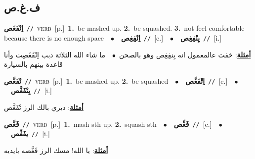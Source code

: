 \documentclass[10pt,a4paper,twoside]{article} %
\begin{document}
\begin{multicols}{2}
\vspace{-3mm}
\subsection*{\color{blue}\foreignlanguage{arabic}{ف.غ.ص}\color{blue}{}} 

{\setlength\topsep{0pt}\textbf{\foreignlanguage{arabic}{اِنْفَغَص}}\ {\color{gray}\texttt{//}\color{black}}\ \textsc{verb}\ [p.]\ \textbf{1.}~be mashed up.  \textbf{2.}~be squashed.  \textbf{3.}~not feel comfortable because there is no enough space\ \ $\bullet$\ \ \setlength\topsep{0pt}\textbf{\foreignlanguage{arabic}{اِنْفِغِص}}\ {\color{gray}\texttt{//}\color{black}}\ [c.]\ \ $\bullet$\ \ \setlength\topsep{0pt}\textbf{\foreignlanguage{arabic}{يِنْفِغِص}}\ {\color{gray}\texttt{//}\color{black}}\ [i.]\  \begin{flushright}\color{gray}\foreignlanguage{arabic}{\textbf{\underline{\foreignlanguage{arabic}{أمثلة}}}: خفت عالمعمول انه يِنفِغِص وهو بالصحن\ $\bullet$\ \  ما شاء الله الثلاثة دبب اِنْفَغَصِت وأنا قاعدة بينهم بالسيارة}\end{flushright}\color{black}} \vspace{2mm}

{\setlength\topsep{0pt}\textbf{\foreignlanguage{arabic}{تْفَغَّص}}\ {\color{gray}\texttt{//}\color{black}}\ \textsc{verb}\ [p.]\ \textbf{1.}~be mashed up.  \textbf{2.}~be squashed\ \ $\bullet$\ \ \setlength\topsep{0pt}\textbf{\foreignlanguage{arabic}{اِتْفَغَّص}}\ {\color{gray}\texttt{//}\color{black}}\ [c.]\ \ $\bullet$\ \ \setlength\topsep{0pt}\textbf{\foreignlanguage{arabic}{يِتْفَغَّص}}\ {\color{gray}\texttt{//}\color{black}}\ [i.]\  \begin{flushright}\color{gray}\foreignlanguage{arabic}{\textbf{\underline{\foreignlanguage{arabic}{أمثلة}}}: ديري بالك الرز تْفَغَّص}\end{flushright}\color{black}} \vspace{2mm}

{\setlength\topsep{0pt}\textbf{\foreignlanguage{arabic}{فَغَّص}}\ {\color{gray}\texttt{//}\color{black}}\ \textsc{verb}\ [p.]\ \textbf{1.}~mash sth up.  \textbf{2.}~squash sth\ \ $\bullet$\ \ \setlength\topsep{0pt}\textbf{\foreignlanguage{arabic}{فَغِّص}}\ {\color{gray}\texttt{//}\color{black}}\ [c.]\ \ $\bullet$\ \ \setlength\topsep{0pt}\textbf{\foreignlanguage{arabic}{يفَغِّص}}\ {\color{gray}\texttt{//}\color{black}}\ [i.]\  \begin{flushright}\color{gray}\foreignlanguage{arabic}{\textbf{\underline{\foreignlanguage{arabic}{أمثلة}}}: يا الله! مسك الرز فَغَّصه بايديه}\end{flushright}\color{black}} \vspace{2mm}


\end{multicols}
\end{document}
